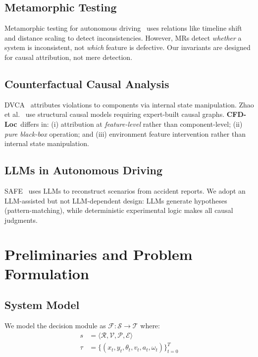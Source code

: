 \documentclass[conference]{IEEEtran}
\theoremstyle{plain}
\newcommand{\methodname}{\textbf{CFD-Loc}}
\newcommand{\scenario}{\mathcal{S}}
\newcommand{\traj}{\mathcal{T}}
\newcommand{\sys}{\mathcal{F}}
\begin{document}
\subsection{Metamorphic Testing}
Metamorphic testing for autonomous driving~\cite{deng2023rmt} uses relations like timeline shift and distance scaling to detect inconsistencies. However, MRs detect \emph{whether} a system is inconsistent, not \emph{which} feature is defective. Our invariants are designed for causal attribution, not mere detection.

\subsection{Counterfactual Causal Analysis}
DVCA~\cite{wan2024dvca} attributes violations to components via internal state manipulation. Zhao et al.~\cite{zhao2023causal} use structural causal models requiring expert-built causal graphs. \methodname\ differs in: (i) attribution at \emph{feature-level} rather than component-level; (ii) \emph{pure black-box} operation; and (iii) environment feature intervention rather than internal state manipulation.

\subsection{LLMs in Autonomous Driving}
SAFE~\cite{safe2026} uses LLMs to reconstruct scenarios from accident reports. We adopt an LLM-assisted but not LLM-dependent design: LLMs generate hypotheses (pattern-matching), while deterministic experimental logic makes all causal judgments.

\section{Preliminaries and Problem Formulation}
\label{sec:prelim}

\subsection{System Model}
We model the decision module as $\sys: \scenario \to \traj$ where:
\begin{align}
s &= \langle \mathcal{R}, \mathcal{V}, \mathcal{P}, \mathcal{E} \rangle \label{eq:scenario}\\
\tau &= \{(x_t, y_t, \theta_t, v_t, a_t, \omega_t)\}_{t=0}^T \label{eq:trajectory}
\end{align}
\end{document}
